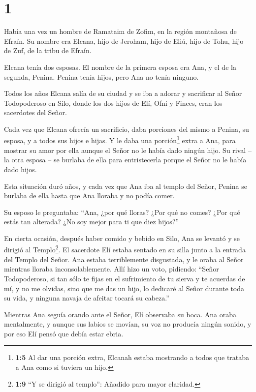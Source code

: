 \hypertarget{section}{%
\section{1}\label{section}}

 Había una vez un hombre de Ramataim de Zofim, en la región
montañosa de Efraín. Su nombre era Elcana, hijo de Jeroham, hijo de
Eliú, hijo de Tohu, hijo de Zuf, de la tribu de Efraín.

 Elcana tenía dos esposas. El nombre de la primera esposa
era Ana, y el de la segunda, Penina. Penina tenía hijos, pero Ana no
tenía ninguno.

 Todos los años Elcana salía de su ciudad y se iba a adorar
y sacrificar al Señor Todopoderoso en Silo, donde los dos hijos de Elí,
Ofni y Finees, eran los sacerdotes del Señor.

 Cada vez que Elcana ofrecía un sacrificio, daba porciones
del mismo a Penina, su esposa, y a todos sus hijos e hijas. 
Y le daba una porción\footnote{\textbf{1:5} Al dar una porción extra,
  Elcanah estaba mostrando a todos que trataba a Ana como si tuviera un
  hijo.} extra a Ana, para mostrar su amor por ella aunque el Señor no
le había dado ningún hijo.  Su rival -- la otra esposa -- se
burlaba de ella para entristecerla porque el Señor no le había dado
hijos.

 Esta situación duró años, y cada vez que Ana iba al templo
del Señor, Penina se burlaba de ella hasta que Ana lloraba y no podía
comer.

 Su esposo le preguntaba: ``Ana, ¿por qué lloras? ¿Por qué
no comes? ¿Por qué estás tan alterada? ¿No soy mejor para ti que diez
hijos?''

 En cierta ocasión, después haber comido y bebido en Silo,
Ana se levantó y se dirigió al Templo\footnote{\textbf{1:9} ``Y se
  dirigió al templo'': Añadido para mayor claridad.}. El sacerdote Elí
estaba sentado en su silla junto a la entrada del Templo del Señor.
 Ana estaba terriblemente disgustada, y le oraba al Señor
mientras lloraba inconsolablemente.  Allí hizo un voto,
pidiendo: ``Señor Todopoderoso, si tan sólo te fijas en el sufrimiento
de tu sierva y te acuerdas de mí, y no me olvidas, sino que me das un
hijo, lo dedicaré al Señor durante toda su vida, y ninguna navaja de
afeitar tocará su cabeza.''

 Mientras Ana seguía orando ante el Señor, Elí observaba su
boca.  Ana oraba mentalmente, y aunque sus labios se
movían, su voz no producía ningún sonido, y por eso Elí pensó que debía
estar ebria.

